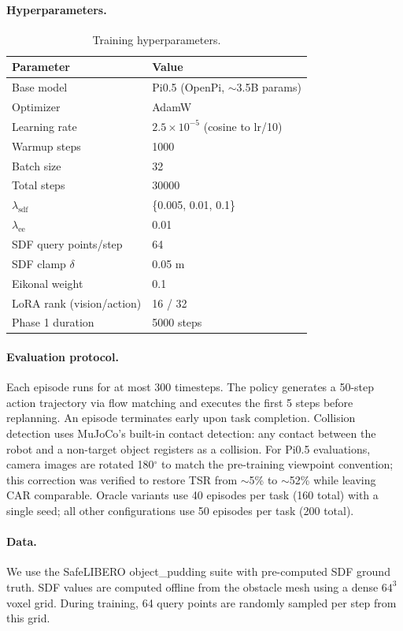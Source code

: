 \paragraph{Hyperparameters.}
\begin{table}[h]
\centering
\caption{Training hyperparameters.}
\label{tab:hyperparams}
\footnotesize
\begin{tabular*}{\columnwidth}{l@{\extracolsep{\fill}}l}
\toprule
Parameter & Value \\
\midrule
Base model & Pi0.5 (OpenPi, $\sim$3.5B params) \\
Optimizer & AdamW \\
Learning rate & $2.5 \times 10^{-5}$ (cosine to lr/10) \\
Warmup steps & 1000 \\
Batch size & 32 \\
Total steps & 30000 \\
$\lambda_\mathrm{sdf}$ & \{0.005, 0.01, 0.1\} \\
$\lambda_\mathrm{ee}$ & 0.01 \\
SDF query points/step & 64 \\
SDF clamp $\delta$ & 0.05 m \\
Eikonal weight & 0.1 \\
LoRA rank (vision/action) & 16 / 32 \\
Phase 1 duration & 5000 steps \\
\bottomrule
\end{tabular*}
\end{table}

\paragraph{Evaluation protocol.}
Each episode runs for at most 300 timesteps. The policy generates a 50-step action trajectory via flow matching and executes the first 5 steps before replanning. An episode terminates early upon task completion. Collision detection uses MuJoCo's built-in contact detection: any contact between the robot and a non-target object registers as a collision. For Pi0.5 evaluations, camera images are rotated 180$^\circ$ to match the pre-training viewpoint convention; this correction was verified to restore TSR from ${\sim}$5\% to ${\sim}$52\% while leaving CAR comparable. Oracle variants use 40 episodes per task (160 total) with a single seed; all other configurations use 50 episodes per task (200 total).

\paragraph{Data.}
We use the SafeLIBERO object\_pudding suite with pre-computed SDF ground truth. SDF values are computed offline from the obstacle mesh using a dense $64^3$ voxel grid. During training, 64 query points are randomly sampled per step from this grid.

